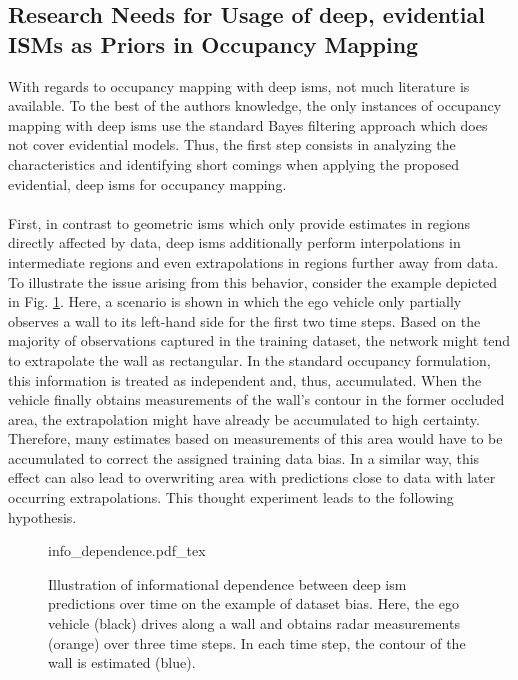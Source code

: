 \subsection{Research Needs for Usage of deep, evidential ISMs as Priors in Occupancy Mapping}
\label{subsec:research_needs_for_usage_of_deep_ims_as_priors_in_occmapping}
With regards to occupancy mapping with deep \gls{ism}s, not much literature is available. To the best of the authors knowledge, the only instances of occupancy mapping with deep \gls{ism}s use the standard Bayes filtering approach which does not cover evidential models. Thus, the first step consists in analyzing the characteristics and identifying short comings when applying the proposed evidential, deep \gls{ism}s for occupancy mapping.
\\\\
First, in contrast to geometric \gls{ism}s which only provide estimates in regions directly affected by data, deep \gls{ism}s additionally perform interpolations in intermediate regions and even extrapolations in regions further away from data. To illustrate the issue arising from this behavior, consider the example depicted in Fig. \ref{fig:info_dependence}. Here, a scenario is shown in which the ego vehicle only partially observes a wall to its left-hand side for the first two time steps. Based on the majority of observations captured in the training dataset, the network might tend to extrapolate the wall as rectangular. In the standard occupancy formulation, this information is treated as independent and, thus, accumulated. When the vehicle finally obtains measurements of the wall's contour in the former occluded area, the extrapolation might have already be accumulated to high certainty. Therefore, many estimates based on measurements of this area would have to be accumulated to correct the assigned training data bias. In a similar way, this effect can also lead to overwriting area with predictions close to data with later occurring extrapolations. This thought experiment leads to the following hypothesis.
\begin{figure}
	\begin{center}
		{info_dependence.pdf_tex}
		\caption{\label{fig:info_dependence}Illustration of informational dependence between deep \gls{ism} predictions over time on the example of dataset bias. Here, the ego vehicle (black) drives along a wall and obtains radar measurements (orange) over three time steps. In each time step, the contour of the wall is estimated (blue).}
	\end{center}
\end{figure}  
